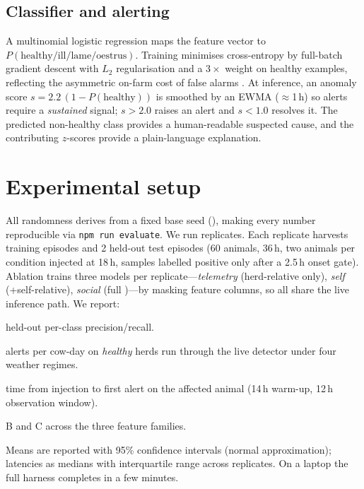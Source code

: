 \documentclass[11pt]{article}
\begin{document}
\subsection{Classifier and alerting}
A multinomial logistic regression maps the feature vector to
$P(\text{healthy}/\text{ill}/\text{lame}/\text{oestrus})$. Training minimises
cross-entropy by full-batch gradient descent with $L_2$ regularisation and a
$3\times$ weight on healthy examples, reflecting the asymmetric on-farm cost of
false alarms \citep{king2001logistic}. At inference, an anomaly score
$s = 2.2\,(1-P(\text{healthy}))$ is smoothed by an EWMA ($\approx$1\,h) so alerts
require a \emph{sustained} signal; $s>2.0$ raises an alert and $s<1.0$ resolves
it. The predicted non-healthy class provides a human-readable suspected cause,
and the contributing $z$-scores provide a plain-language explanation.

\section{Experimental setup}
All randomness derives from a fixed base seed (\baseseed), making every number
reproducible via \texttt{npm run evaluate}. We run \numreplicates{} replicates.
Each replicate harvests \trainepisodes{} training episodes and 2 held-out test
episodes (60 animals, 36\,h, two animals per condition injected at 18\,h, samples
labelled positive only after a 2.5\,h onset gate). Ablation trains three models
per replicate---\emph{telemetry} (herd-relative only), \emph{self}
(+self-relative), \emph{social} (full \numfeatures{})---by masking feature
columns, so all share the live inference path. We report:

\begin{description}\itemsep2pt
  \item[A. Classification] held-out per-class precision/recall.
  \item[B. False positives] alerts per cow-day on \emph{healthy} herds run
  through the live detector under four weather regimes.
  \item[C. Detection latency] time from injection to first alert on the affected
  animal (14\,h warm-up, 12\,h observation window).
  \item[D. Ablation] B and C across the three feature families.
\end{description}
Means are reported with 95\% confidence intervals (normal approximation);
latencies as medians with interquartile range across replicates. On a laptop the
full harness completes in a few minutes.
\end{document}
